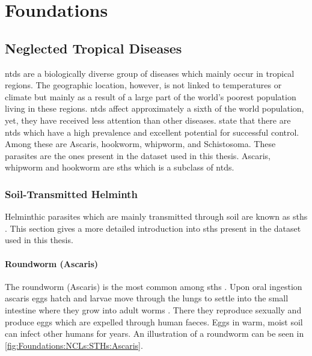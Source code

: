 \chapter{Foundations}
\label{ch:Foundations}


\section{Neglected Tropical Diseases}
\label{sec:Foundations:NTDs}

\Acp{ntd} \cite{feasey2010neglected} are a biologically diverse group of diseases which mainly occur in tropical regions. The geographic location, however, is not linked to temperatures or climate but mainly as a result of a large part of the world's poorest population living in these regions. \Acp{ntd} affect approximately a sixth of the world population, yet, they have received less attention than other diseases. \textcite{feasey2010neglected} state that there are \acp{ntd} which have a high prevalence and excellent potential for successful control. Among these are Ascaris, hookworm, whipworm, and Schistosoma. These parasites are the ones present in the dataset used in this thesis. Ascaris, whipworm and hookworm are \acp{sth} which is a subclass of \acp{ntd}.

\subsection{Soil-Transmitted Helminth} %
\label{sec:Foundations:NTDs:STHs} 

Helminthic parasites which are mainly transmitted through soil are known as \aclp{sth} \cite{feasey2010neglected,jourdan2018soiltransmitted}. This section gives a more detailed introduction into \acp{sth} present in the dataset used in this thesis.


\subsubsection{Roundworm (Ascaris)}
\label{sec:Foundations:NTDs:STHs:Ascaris}

The roundworm (Ascaris) is the most common among \acp{sth} \cite{jamison2006helminth}. Upon oral ingestion ascaris eggs hatch and larvae move through the lungs to settle into the small intestine where they grow into adult worms \cite{jourdan2018soiltransmitted}. There they reproduce sexually and produce eggs which are expelled through human faeces. Eggs in warm, moist soil can infect other humans for years. An illustration of a roundworm can be seen in \autoref{fig:Foundations:NCLs:STHs:Ascaris}.

